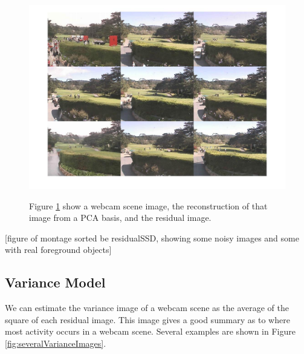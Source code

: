 \begin{figure}
	\centering
		\includegraphics[width=1\textwidth]{figures/residualSSDmontage.jpg}
	\label{fig:residualSSDmontage}
	
		\caption[Residual SSD Montage.]{Figure \ref{fig:residualSSDmontage} show a webcam scene image, the reconstruction of that image from a PCA basis, and the residual image.}
\end{figure}

[figure of montage sorted be residualSSD, showing some noisy images and some with real foreground objects]


\subsection{Variance Model}

We can estimate the variance image of a webcam scene as the average of the square of each residual image.  This image gives a good summary as to where most activity occurs in a webcam scene.  Several examples are shown in Figure \ref{fig:severalVarianceImages}.

